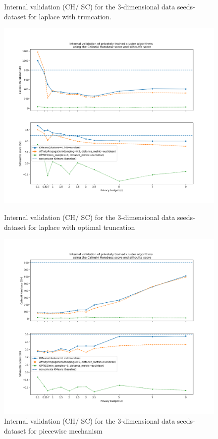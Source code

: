\begin{figure}[H]
\begin{minipage}[c]{0.49\textwidth}
        \caption{Internal validation (CH/ SC) for the 3-dimensional data seeds-dataset for laplace with truncation.}
        \label{fig:appendix-internal-validation-seeds-dataset_comparison_3d-laplace-truncated}
    \end{minipage}
    \begin{minipage}[c]{0.49\textwidth}
        \includegraphics[width=1\textwidth]{Results/3d-laplace-optimal-truncated/seeds-dataset/ch-and-sc.png}
        \caption{Internal validation (CH/ SC) for the 3-dimensional data seeds-dataset for laplace with optimal truncation}
        \label{fig:appendix-internal-validation-seeds-dataset_comparison_3d-laplace-optimal-truncated}
    \end{minipage}
    \begin{minipage}[c]{0.49\textwidth}
        \includegraphics[width=1\textwidth]{Results/3d-piecewise/seeds-dataset/ch-and-sc.png}
        \caption{Internal validation (CH/ SC) for the 3-dimensional data seeds-dataset for piecewise mechanism}
        \label{fig:appendix-internal-validation-seeds-dataset_comparison_3d-piecewise}
    \end{minipage}
\end{figure}

